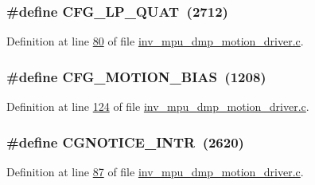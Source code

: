 \subsubsection[{\texorpdfstring{C\+F\+G\+\_\+\+L\+P\+\_\+\+Q\+U\+AT}{CFG_LP_QUAT}}]{\setlength{\rightskip}{0pt plus 5cm}\#define C\+F\+G\+\_\+\+L\+P\+\_\+\+Q\+U\+AT~(2712)}\hypertarget{group___d_r_i_v_e_r_s_gadf5652e51b8c08c2eb6a902d1d1f319c}{}\label{group___d_r_i_v_e_r_s_gadf5652e51b8c08c2eb6a902d1d1f319c}


Definition at line \hyperlink{inv__mpu__dmp__motion__driver_8c_source_l00080}{80} of file \hyperlink{inv__mpu__dmp__motion__driver_8c_source}{inv\+\_\+mpu\+\_\+dmp\+\_\+motion\+\_\+driver.\+c}.

\subsubsection[{\texorpdfstring{C\+F\+G\+\_\+\+M\+O\+T\+I\+O\+N\+\_\+\+B\+I\+AS}{CFG_MOTION_BIAS}}]{\setlength{\rightskip}{0pt plus 5cm}\#define C\+F\+G\+\_\+\+M\+O\+T\+I\+O\+N\+\_\+\+B\+I\+AS~(1208)}\hypertarget{group___d_r_i_v_e_r_s_ga8214527cbba23694722d04715126be0f}{}\label{group___d_r_i_v_e_r_s_ga8214527cbba23694722d04715126be0f}


Definition at line \hyperlink{inv__mpu__dmp__motion__driver_8c_source_l00124}{124} of file \hyperlink{inv__mpu__dmp__motion__driver_8c_source}{inv\+\_\+mpu\+\_\+dmp\+\_\+motion\+\_\+driver.\+c}.

\subsubsection[{\texorpdfstring{C\+G\+N\+O\+T\+I\+C\+E\+\_\+\+I\+N\+TR}{CGNOTICE_INTR}}]{\setlength{\rightskip}{0pt plus 5cm}\#define C\+G\+N\+O\+T\+I\+C\+E\+\_\+\+I\+N\+TR~(2620)}\hypertarget{group___d_r_i_v_e_r_s_gafd43f64b7c6bc86374cedfcf69c6b12f}{}\label{group___d_r_i_v_e_r_s_gafd43f64b7c6bc86374cedfcf69c6b12f}


Definition at line \hyperlink{inv__mpu__dmp__motion__driver_8c_source_l00087}{87} of file \hyperlink{inv__mpu__dmp__motion__driver_8c_source}{inv\+\_\+mpu\+\_\+dmp\+\_\+motion\+\_\+driver.\+c}.

